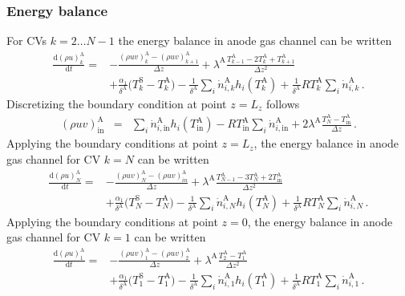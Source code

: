 \documentclass[pdftex,a4paper, 12pt]{article}
\begin{document}
\subsubsection*{Energy balance}
%
%
For CVs $k=2 \dots N-1$ the energy balance in anode gas channel can be written
%
\begin{align}
	\frac{\mathrm{d} (\rho u)_{k}^{\mathrm{A}}}{\mathrm{d} t} = &-\frac{(\rho u v)_{k}^{\mathrm{A}} 
		- (\rho u v)_{k+1}^{\mathrm{A}} }{\Delta z} 
	+ \lambda^{\mathrm{A}} \frac{T_{k-1}^{\mathrm{A}} -2T_{k}^{\mathrm{A}} +T_{k+1}^{\mathrm{A}}}{\Delta z^2} \nonumber \\ &+ \frac{\alpha_1}{\delta^{\mathrm{A}}} \big( T_{k}^{\mathrm{S}} - T_{k}^{\mathrm{A}} \big) - \frac{1}{\delta^{\mathrm{A}}} \sum_{i} \dot{n}_{i,k}^{\mathrm{A}} h_{i}(T_k^{\mathrm{A}}) + \frac{1}{\delta^{\mathrm{A}}} R T_k^{\mathrm{A}} \sum_{i} \dot{n}_{i,k}^{\mathrm{A}} \, .
	\label{eq:energy_balA_disc_count}
\end{align}
%
Discretizing the boundary condition at point $z=L_{z}$ follows
%
\begin{eqnarray}
	(\rho u v)_{\mathrm{in}}^{\mathrm{A}} &=& \sum_{i} \dot{n}_{i,\mathrm{in}}^{\mathrm{A}} h_{i}(T_{\mathrm{in}}^{\mathrm{A}}) - R T_{\mathrm{in}}^{\mathrm{A}} \sum_{i} \dot{n}_{i,\mathrm{in}}^{\mathrm{A}} + 2\lambda^{\mathrm{A}} \frac{T_{N}^{\mathrm{A}} - T_{\mathrm{in}}^{\mathrm{A}}}{\Delta z}  \, .
\end{eqnarray}
%
%
Applying the boundary conditions at point $z=L_{z}$, the energy balance in anode gas channel for CV $k = N$ can be written
%
\begin{align}
	\frac{\mathrm{d} (\rho u)_{N}^{\mathrm{A}}}{\mathrm{d} t} = & -\frac{(\rho u v)_{N}^{\mathrm{A}} 
		- (\rho u v)_{in}^{\mathrm{A}} }{\Delta z}
	+ \lambda^{\mathrm{A}} \frac{T_{N-1}^{\mathrm{A}} - 3 T_{N}^{\mathrm{A}} +2 T_{\mathrm{in}}^{\mathrm{A}}}{\Delta z^2}  \nonumber \\ &+ \frac{\alpha_1}{\delta^{\mathrm{A}}} \big( T_{N}^{\mathrm{S}} - T_{N}^{\mathrm{A}} \big) - \frac{1}{\delta^{\mathrm{A}}} \sum_{i} \dot{n}_{i,N}^{\mathrm{A}} h_{i}(T_N^{\mathrm{A}}) + \frac{1}{\delta^{\mathrm{A}}} R T_N^{\mathrm{A}} \sum_{i} \dot{n}_{i,N}^{\mathrm{A}} \, .
	\label{eq:energy_balA_disc1_count}
\end{align}
%
Applying the boundary conditions at point $z=0$, the energy balance in anode gas channel for CV $k = 1$ can be written
%
\begin{align}
	\frac{\mathrm{d} (\rho u)_{1}^{\mathrm{A}}}{\mathrm{d} t} = & - \frac{(\rho u v)_{1}^{\mathrm{A}} 
		- (\rho u v)_{2}^{\mathrm{A}} }{\Delta z}
	+ \lambda^{\mathrm{A}} \frac{T_{2}^{\mathrm{A}} - T_{1}^{\mathrm{A}}}{\Delta z^2}  \nonumber \\ &+ \frac{\alpha_1}{\delta^{\mathrm{A}}} \big( T_{1}^{\mathrm{S}} - T_{1}^{\mathrm{A}} \big) - \frac{1}{\delta^{\mathrm{A}}} \sum_{i} \dot{n}_{i,1}^{\mathrm{A}} h_{i}(T_1^{\mathrm{A}}) + \frac{1}{\delta^{\mathrm{A}}} R T_1^{\mathrm{A}} \sum_{i} \dot{n}_{i,1}^{\mathrm{A}} \, .
	\label{eq:energy_balA_discN_count}
\end{align}
%
\end{document}
